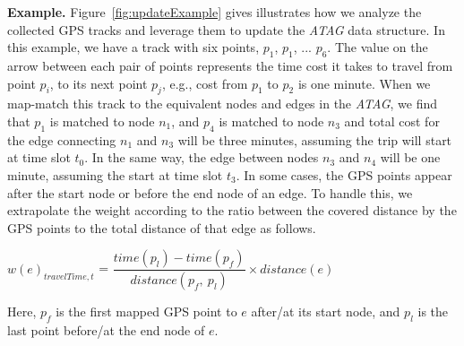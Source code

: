 %


\textbf{Example.}
Figure~\ref{fig:updateExample} gives illustrates how we analyze the collected GPS tracks and leverage them to update the {\em ATAG} data structure. In this example, we have a track with six points, $p_1$, $p_1$, ... $p_6$. The value on the arrow between each pair of points represents the time cost it takes to travel from point $p_i$, to its next point $p_j$, e.g., cost from $p_1$ to $p_2$ is one minute. When we map-match this track to the equivalent nodes and edges in the {\em ATAG}, we find that $p_1$ is matched to node $n_1$, and $p_4$ is matched to node $n_3$ and total cost for the edge connecting $n_1$ and $n_3$ will be three minutes, assuming the trip will start at time slot $t_0$. In the same way, the edge between nodes $n_3$ and $n_4$ will be one minute, assuming the start at time slot $t_3$. In some cases, the GPS points appear after the start node or before the end node of an edge. To handle this, we extrapolate the weight according to the ratio between the covered distance by the GPS points to the total distance of that edge as follows.
\begin{center}
$w(e)_{travelTime,t}$ = $\dfrac{\textstyle time(p_l)-time(p_f)}{distance(p_f,~p_l)}\times distance(e)$
\end{center}
%
Here, $p_f$ is the first mapped GPS point to $e$ after/at its start node, and $p_l$ is the last point before/at the end node of $e$.



